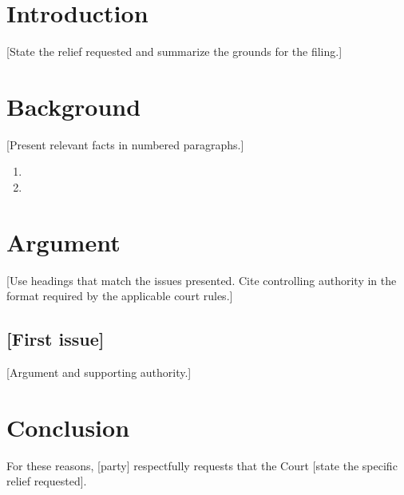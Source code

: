 \documentclass[12pt]{article}
\begin{document}
\makecaption
\maketitleblock

\section*{Introduction}
[State the relief requested and summarize the grounds for the filing.]

\section{Background}
[Present relevant facts in numbered paragraphs.]

\begin{enumerate}[label=\arabic*., leftmargin=0.5in]
  \item [First factual allegation.]
  \item [Second factual allegation.]
\end{enumerate}

\section{Argument}
[Use headings that match the issues presented. Cite controlling authority in the
format required by the applicable court rules.]

\subsection{[First issue]}
[Argument and supporting authority.]

\section*{Conclusion}
For these reasons, [party] respectfully requests that the Court [state the
specific relief requested].

\signatureblock

\newpage
{}
\end{document}
